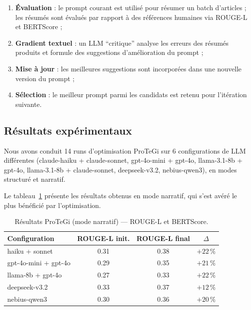 \begin{enumerate}
  \item \textbf{Évaluation} : le prompt courant est utilisé pour résumer
    un batch d'articles ; les résumés sont évalués par rapport à des
    références humaines via ROUGE-L \cite{lin2004rouge} et BERTScore
    \cite{zhang2020bertscore} ;
  \item \textbf{Gradient textuel} : un LLM ``critique'' analyse les
    erreurs des résumés produits et formule des suggestions d'amélioration
    du prompt ;
  \item \textbf{Mise à jour} : les meilleures suggestions sont incorporées
    dans une nouvelle version du prompt ;
  \item \textbf{Sélection} : le meilleur prompt parmi les candidats est
    retenu pour l'itération suivante.
\end{enumerate}

\subsection{Résultats expérimentaux}

Nous avons conduit 14 runs d'optimisation ProTeGi sur 6 configurations
de LLM différentes (claude-haiku + claude-sonnet, gpt-4o-mini + gpt-4o,
llama-3.1-8b + gpt-4o, llama-3.1-8b + claude-sonnet, deepseek-v3.2,
nebius-qwen3), en modes structuré et narratif.

Le tableau~\ref{tab:protegi_results} présente les résultats obtenus
en mode narratif, qui s'est avéré le plus bénéficié par l'optimisation.

\begin{table}[htbp]
  \centering
  \caption{Résultats ProTeGi (mode narratif) — ROUGE-L et BERTScore.}
  \label{tab:protegi_results}
  \begin{tabular}{lccc}
    \toprule
    \textbf{Configuration} & \textbf{ROUGE-L init.} & \textbf{ROUGE-L final} & \textbf{$\Delta$} \\
    \midrule
    haiku + sonnet & 0.31 & 0.38 & $+22\,\%$ \\
    gpt-4o-mini + gpt-4o & 0.29 & 0.35 & $+21\,\%$ \\
    llama-8b + gpt-4o & 0.27 & 0.33 & $+22\,\%$ \\
    deepseek-v3.2 & 0.33 & 0.37 & $+12\,\%$ \\
    nebius-qwen3 & 0.30 & 0.36 & $+20\,\%$ \\
    \bottomrule
  \end{tabular}
\end{table}

